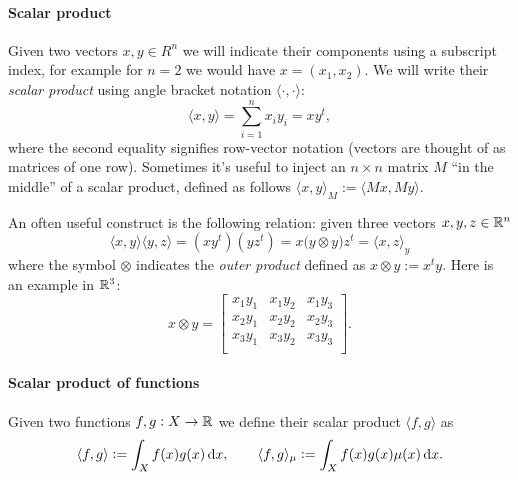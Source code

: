 \paragraph{Scalar product}

Given two vectors $x,y \in R^n$ we will indicate their components using a
subscript index,
for example for $n=2$ we would have $x = (x_1, x_2)$.
We will write their \textsl{scalar product} using angle bracket notation
$\langle \cdot, \cdot \rangle$:
\begin{displaymath}
\langle x, y \rangle = \sum_{i=1}^n x_i y_i = xy^t,
\end{displaymath}
where the second equality signifies row-vector notation (vectors are thought
of as matrices of one row). Sometimes it's useful to inject an $n\times n$ matrix $M$ ``in the middle''
of a scalar product, defined as follows $\langle x, y \rangle_M := \langle M x, M y \rangle$.

An often useful construct is the following relation: given
three vectors $x,y,z \in \mathbb{R}^n$
\begin{displaymath}
\langle x,y \rangle \langle y,z \rangle
  = \left(x y^t\right)\left(y z^t\right)
  = x \big(y \otimes y\big) z^t
  = \langle x, z\rangle_y
\end{displaymath}
where the symbol $\otimes$ indicates the \textsl{outer product} defined as $x\otimes y :=
x^t y$. Here is an example in $\mathbb{R}^3$:
\begin{displaymath}
x\otimes y =
\left[
\begin{array}{ccc}
x_1 y_1 & x_1 y_2 & x_1 y_3 \\
x_2 y_1 & x_2 y_2 & x_2 y_3 \\
x_3 y_1 & x_3 y_2 & x_3 y_3 \\
\end{array}
\right].
\end{displaymath}


\paragraph{Scalar product of functions}
Given two functions $f,g:X\to\mathbb{R}$ we define their scalar product
$\langle f, g \rangle$ as
\begin{displaymath}
\langle f, g \rangle := \int_X f(x)g(x) \mathop{}\!\mathrm{d} x, \qquad \langle f, g \rangle_\mu := \int_X f(x)g(x)\mu(x) \mathop{}\!\mathrm{d} x.
\end{displaymath}

